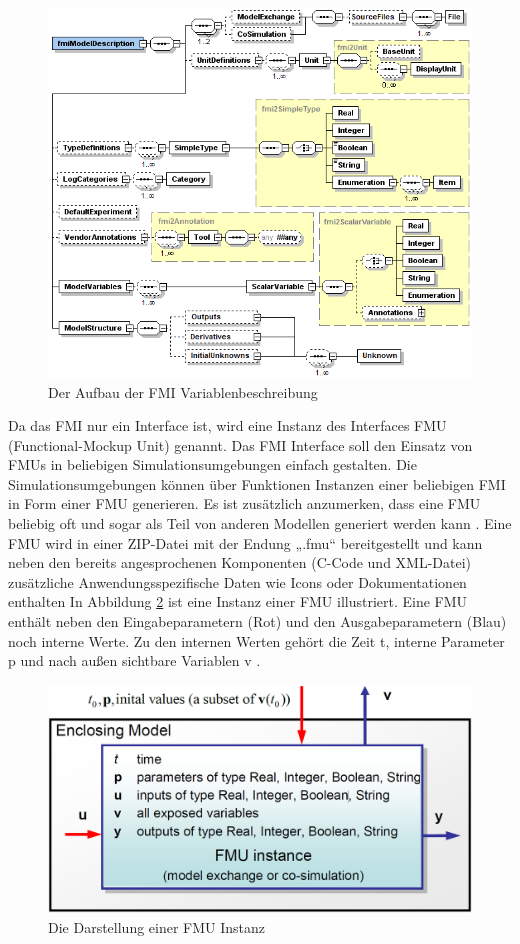 \begin{figure}[h]
	\centering
	\includegraphics[width=0.7\linewidth]{Bilder/A20_FMIOverview}
	\caption{Der Aufbau der FMI Variablenbeschreibung \cite[S.30]{25}}
	\label{fig:FMIOverview}
\end{figure}
\noindent Da das FMI nur ein Interface ist, wird eine Instanz des Interfaces FMU (Functional-Mockup Unit) genannt. Das FMI Interface soll den Einsatz von FMUs in beliebigen Simulationsumgebungen einfach gestalten. Die Simulationsumgebungen können über Funktionen Instanzen einer beliebigen FMI in Form einer FMU generieren. Es ist zusätzlich anzumerken, dass eine FMU beliebig oft und sogar als Teil von anderen Modellen generiert werden kann \cite[S.8]{25}. Eine FMU wird in einer ZIP-Datei mit der Endung „.fmu“ bereitgestellt und kann neben den bereits angesprochenen Komponenten (C-Code und XML-Datei) zusätzliche Anwendungsspezifische Daten wie Icons oder Dokumentationen enthalten \cite[S.4+9]{25} In Abbildung \ref{fig:FMIBlock} ist eine Instanz einer FMU illustriert. Eine FMU enthält neben den Eingabeparametern (Rot) und den Ausgabeparametern (Blau) noch interne Werte. Zu den internen Werten gehört die Zeit t, interne Parameter p und nach außen sichtbare Variablen v \cite[S.8]{25}.
\begin{figure}[h]
	\centering
	\includegraphics[width=0.5\linewidth]{Bilder/A21_FMIBlock}
	\caption{Die Darstellung einer FMU Instanz \cite[S.9]{25}}
	\label{fig:FMIBlock}
\end{figure}
